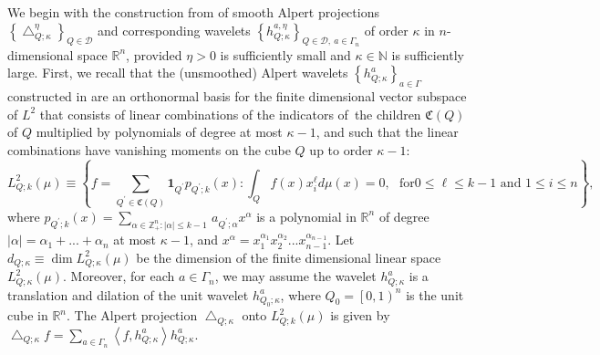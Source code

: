 \documentclass{amsart}%
\theoremstyle{plain}
\numberwithin{equation}{section}
\begin{document}
We begin with the construction from \cite{Saw7} of smooth Alpert projections
$\left\{  \bigtriangleup_{Q;\kappa}^{\eta}\right\}  _{Q\in\mathcal{D}}$ and
corresponding wavelets $\left\{  h_{Q;\kappa}^{a,\eta}\right\}  _{Q\in
\mathcal{D},\ a\in\Gamma_{n}}$ of order $\kappa$ in $n$-dimensional space
$\mathbb{R}^{n}$, provided $\eta>0$ is sufficiently small and $\kappa
\in\mathbb{N}$ is sufficiently large. First, we recall that the (unsmoothed)
Alpert wavelets $\left\{  h_{Q;\kappa}^{a}\right\}  _{a\in\Gamma}$ constructed
in \cite{RaSaWi} are an orthonormal basis for the finite dimensional vector
subspace of $L^{2}$ that consists of linear combinations of the indicators
of\ the children $\mathfrak{C}\left(  Q\right)  $ of $Q$ multiplied by
polynomials of degree at most $\kappa-1$, and such that the linear
combinations have vanishing moments on the cube $Q$ up to order $\kappa-1$:%
\[
L_{Q;k}^{2}\left(  \mu\right)  \equiv\left\{
f=\mathop{\displaystyle \sum }\limits_{Q^{\prime}\in\mathfrak{C}\left(
Q\right)  }\mathbf{1}_{Q^{\prime}}p_{Q^{\prime};k}\left(  x\right)  :\int
_{Q}f\left(  x\right)  x_{i}^{\ell}d\mu\left(  x\right)  =0,\ \ \ \text{for
}0\leq\ell\leq k-1\text{ and }1\leq i\leq n\right\}  ,
\]
where $p_{Q^{\prime};k}\left(  x\right)  =\sum_{\alpha\in\mathbb{Z}_{+}%
^{n}:\left\vert \alpha\right\vert \leq k-1\ }a_{Q^{\prime};\alpha}x^{\alpha}$
is a polynomial in $\mathbb{R}^{n}$ of degree $\left\vert \alpha\right\vert
=\alpha_{1}+...+\alpha_{n}$ at most $\kappa-1$, and $x^{\alpha}=x_{1}%
^{\alpha_{1}}x_{2}^{\alpha_{2}}...x_{n-1}^{\alpha_{n-1}}$. Let $d_{Q;\kappa
}\equiv\dim L_{Q;\kappa}^{2}\left(  \mu\right)  $ be the dimension of the
finite dimensional linear space $L_{Q;\kappa}^{2}\left(  \mu\right)  $.
Moreover, for each $a\in\Gamma_{n}$, we may assume the wavelet $h_{Q;\kappa
}^{a}$ is a translation and dilation of the unit wavelet $h_{Q_{0};\kappa}%
^{a}$, where $Q_{0}=\left[  0,1\right)  ^{n}$ is the unit cube in
$\mathbb{R}^{n}$. The Alpert projection $\bigtriangleup_{Q;\kappa}$ onto
$L_{Q;k}^{2}\left(  \mu\right)  $ is given by $\bigtriangleup_{Q;\kappa}%
f=\sum_{a\in\Gamma_{n}}\left\langle f,h_{Q;\kappa}^{a}\right\rangle
h_{Q;\kappa}^{a}$.
\end{document}
